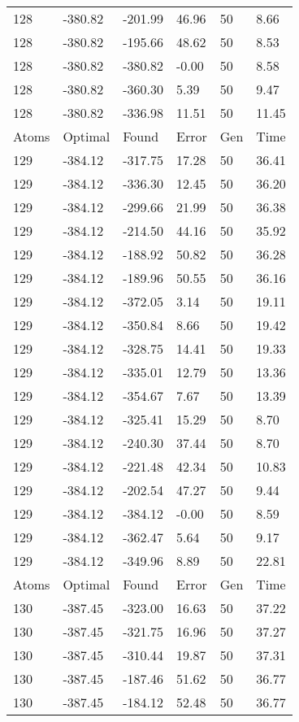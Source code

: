 \documentclass{report}
\begin{document}
\begin{appendix}
\begin{longtable}{llllll}
128 & -380.82 & -201.99 & 46.96 & 50 & 8.66 \\
128 & -380.82 & -195.66 & 48.62 & 50 & 8.53 \\
128 & -380.82 & -380.82 & -0.00 & 50 & 8.58 \\
128 & -380.82 & -360.30 & 5.39 & 50 & 9.47 \\
128 & -380.82 & -336.98 & 11.51 & 50 & 11.45 \\
Atoms & Optimal & Found & Error & Gen & Time \\
129 & -384.12 & -317.75 & 17.28 & 50 & 36.41 \\
129 & -384.12 & -336.30 & 12.45 & 50 & 36.20 \\
129 & -384.12 & -299.66 & 21.99 & 50 & 36.38 \\
129 & -384.12 & -214.50 & 44.16 & 50 & 35.92 \\
129 & -384.12 & -188.92 & 50.82 & 50 & 36.28 \\
129 & -384.12 & -189.96 & 50.55 & 50 & 36.16 \\
129 & -384.12 & -372.05 & 3.14 & 50 & 19.11 \\
129 & -384.12 & -350.84 & 8.66 & 50 & 19.42 \\
129 & -384.12 & -328.75 & 14.41 & 50 & 19.33 \\
129 & -384.12 & -335.01 & 12.79 & 50 & 13.36 \\
129 & -384.12 & -354.67 & 7.67 & 50 & 13.39 \\
129 & -384.12 & -325.41 & 15.29 & 50 & 8.70 \\
129 & -384.12 & -240.30 & 37.44 & 50 & 8.70 \\
129 & -384.12 & -221.48 & 42.34 & 50 & 10.83 \\
129 & -384.12 & -202.54 & 47.27 & 50 & 9.44 \\
129 & -384.12 & -384.12 & -0.00 & 50 & 8.59 \\
129 & -384.12 & -362.47 & 5.64 & 50 & 9.17 \\
129 & -384.12 & -349.96 & 8.89 & 50 & 22.81 \\
Atoms & Optimal & Found & Error & Gen & Time \\
130 & -387.45 & -323.00 & 16.63 & 50 & 37.22 \\
130 & -387.45 & -321.75 & 16.96 & 50 & 37.27 \\
130 & -387.45 & -310.44 & 19.87 & 50 & 37.31 \\
130 & -387.45 & -187.46 & 51.62 & 50 & 36.77 \\
130 & -387.45 & -184.12 & 52.48 & 50 & 36.77 \\

\end{longtable}
\end{appendix}
\end{document}
